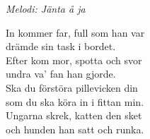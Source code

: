{\footnotesize\textit{Melodi: Jänta å ja}}\par
\vspace{10pt}
In kommer far, full som han var\\
drämde sin task i bordet.\\
Efter kom mor, spotta och svor\\
undra va' fan han gjorde.\\
Ska du förstöra pillevicken din\\
som du ska köra in i fittan min.\\
Ungarna skrek, katten den sket\\
och hunden han satt och runka.
